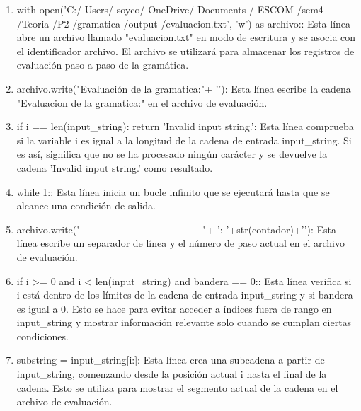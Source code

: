\begin{enumerate}
\begin{enumerate}
    \item with open('C:/ Users/ soyco/ OneDrive/ Documents / ESCOM /sem4 /Teoria /P2 /gramatica /output /evaluacion.txt', 'w') as archivo:: Esta línea abre un archivo llamado "evaluacion.txt" en modo de escritura y se asocia con el identificador archivo. El archivo se utilizará para almacenar los registros de evaluación paso a paso de la gramática.\newline
    
    \item archivo.write("Evaluación de la gramatica:"+ '\n'): Esta línea escribe la cadena "Evaluacion de la gramatica:" en el archivo de evaluación.\newline
    
    \item if i == len(input\_string): return 'Invalid input string.': Esta línea comprueba si la variable i es igual a la longitud de la cadena de entrada input\_string. Si es así, significa que no se ha procesado ningún carácter y se devuelve la cadena 'Invalid input string.' como resultado.\newline
    
    \item while 1:: Esta línea inicia un bucle infinito que se ejecutará hasta que se alcance una condición de salida.\newline
    
    \item archivo.write("-------------------------------------"+ '\nPaso : '+str(contador)+'\n'): Esta línea escribe un separador de línea y el número de paso actual en el archivo de evaluación.\newline
    
    \item if i >= 0 and i < len(input\_string) and bandera == 0:: Esta línea verifica si i está dentro de los límites de la cadena de entrada input\_string y si bandera es igual a 0. Esto se hace para evitar acceder a índices fuera de rango en input\_string y mostrar información relevante solo cuando se cumplan ciertas condiciones.\newline
    
    \item substring = input\_string[i:]: Esta línea crea una subcadena a partir de input\_string, comenzando desde la posición actual i hasta el final de la cadena. Esto se utiliza para mostrar el segmento actual de la cadena en el archivo de evaluación.\newline
    

\end{enumerate}
\end{enumerate}
